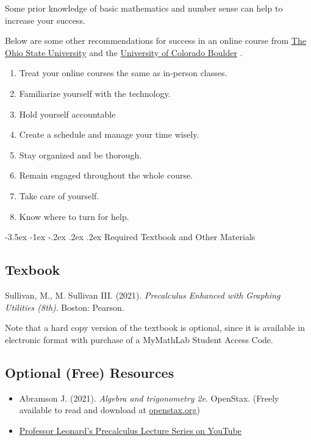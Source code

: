 \documentclass{article}
\makeatletter
\renewcommand\section{\@startsection{section}{1}{0pt}%
  {-3.5ex \@plus -1ex \@minus -.2ex}%
  {.2ex \@plus.2ex}%
  {\normalfont\Large\bfseries}} %
\makeatother
\begin{document}
Some prior knowledge of basic mathematics and number sense can help to increase your success.

Below are some other recommendations for success in an online course from \href{https://online.osu.edu/resources/learn/5-online-learning-tips-student-success}{The Ohio State University} and the \href{https://www.colorado.edu/health/tips-succeeding-online-classes}{University of Colorado Boulder} .

\begin{enumerate}
\item Treat your online courses the same as in-person classes.
\item Familiarize yourself with the technology.
\item Hold yourself accountable
\item Create a schedule and manage your time wisely.
\item Stay organized and be thorough.
\item Remain engaged throughout the whole course.
\item Take care of yourself.
\item Know where to turn for help.
\end{enumerate}

\section{Required Textbook and Other Materials}

\subsection{Texbook}

Sullivan, M., M. Sullivan III. (2021). \textit{Precalculus Enhanced with Graphing Utilities (8th)}. Boston: Pearson.

Note that a hard copy version of the textbook is optional, since it is available in electronic format with purchase of a MyMathLab Student Access Code.

\subsection{Optional (Free) Resources}

\begin{itemize}
\item Abramson J. (2021). \textit{Algebra and trigonometry 2e}. OpenStax. (Freely available to read and download at \href{https://openstax.org/details/books/algebra-and-trigonometry-2e.}{openstax.org})


\item \href{https://youtube.com/playlist?list=PLDesaqWTN6ESsmwELdrzhcGiRhk5DjwLP\&si=G7hNZvDueWkJ9Ydf}{Professor Leonard's Precalculus Lecture Series on YouTube}
\end{itemize}
\end{document}
